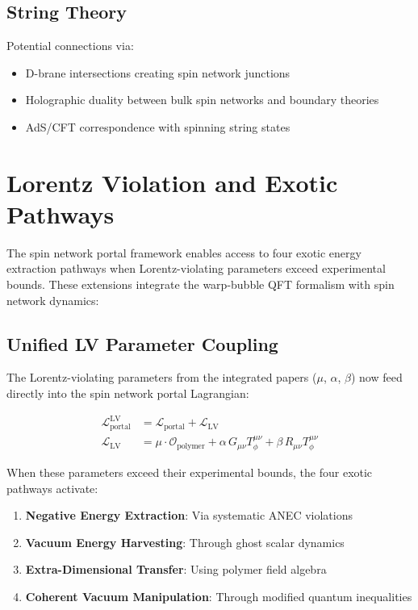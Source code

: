 \documentclass{article}
\begin{document}
\subsection{String Theory}

Potential connections via:
\begin{itemize}
\item D-brane intersections creating spin network junctions
\item Holographic duality between bulk spin networks and boundary theories
\item AdS/CFT correspondence with spinning string states
\end{itemize}

\section{Lorentz Violation and Exotic Pathways}

The spin network portal framework enables access to four exotic energy extraction pathways when Lorentz-violating parameters exceed experimental bounds. These extensions integrate the warp-bubble QFT formalism with spin network dynamics:







\subsection{Unified LV Parameter Coupling}

The Lorentz-violating parameters from the integrated papers ($\mu$, $\alpha$, $\beta$) now feed directly into the spin network portal Lagrangian:

\begin{align}
\mathcal{L}_{\text{portal}}^{\text{LV}} &= \mathcal{L}_{\text{portal}} + \mathcal{L}_{\text{LV}} \\
\mathcal{L}_{\text{LV}} &= \mu \cdot \mathcal{O}_{\text{polymer}} + \alpha \, G_{\mu\nu}T^{\mu\nu}_\phi + \beta \, R_{\mu\nu}T^{\mu\nu}_\phi
\end{align}

When these parameters exceed their experimental bounds, the four exotic pathways activate:
\begin{enumerate}
\item \textbf{Negative Energy Extraction}: Via systematic ANEC violations
\item \textbf{Vacuum Energy Harvesting}: Through ghost scalar dynamics  
\item \textbf{Extra-Dimensional Transfer}: Using polymer field algebra
\item \textbf{Coherent Vacuum Manipulation}: Through modified quantum inequalities
\end{enumerate}
\end{document}

